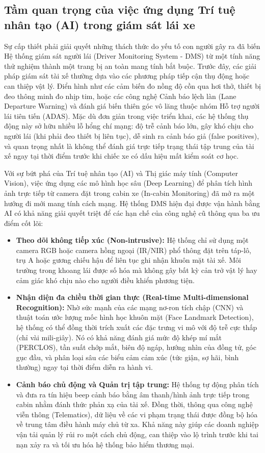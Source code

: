 \documentclass[../DoAn.tex]{subfiles}
\begin{document}
\subsection{Tầm quan trọng của việc ứng dụng Trí tuệ nhân tạo (AI) trong giám sát lái xe}
Sự cấp thiết phải giải quyết những thách thức do yếu tố con người gây ra đã biến Hệ thống giám sát người lái (Driver Monitoring System - DMS) từ một tính năng thử nghiệm thành một trang bị an toàn mang tính bắt buộc. Trước đây, các giải pháp giám sát tài xế thường dựa vào các phương pháp tiếp cận thụ động hoặc can thiệp vật lý. Điển hình như các cảm biến đo nồng độ cồn qua hơi thở, thiết bị đeo thông minh đo nhịp tim, hoặc các công nghệ Cảnh báo lệch làn (Lane Departure Warning) và đánh giá biến thiên góc vô lăng thuộc nhóm Hỗ trợ người lái tiên tiến (ADAS). Mặc dù đơn giản trong việc triển khai, các hệ thống thụ động này sở hữu nhiều lỗ hổng chí mạng: độ trễ cảnh báo lớn, gây khó chịu cho người lái (khi phải đeo thiết bị liên tục), dễ sinh ra cảnh báo giả (false positives), và quan trọng nhất là không thể đánh giá trực tiếp trạng thái tập trung của tài xế ngay tại thời điểm trước khi chiếc xe có dấu hiệu mất kiểm soát cơ học.

Với sự bứt phá của Trí tuệ nhân tạo (AI) và Thị giác máy tính (Computer Vision), việc ứng dụng các mô hình học sâu (Deep Learning) để phân tích hình ảnh trực tiếp từ camera đặt trong cabin xe (In-cabin Monitoring) đã mở ra một hướng đi mới mang tính cách mạng. Hệ thống DMS hiện đại được vận hành bằng AI có khả năng giải quyết triệt để các hạn chế của công nghệ cũ thông qua ba ưu điểm cốt lõi:
\begin{itemize}
    \item \textbf{Theo dõi không tiếp xúc (Non-intrusive):} Hệ thống chỉ sử dụng một camera RGB hoặc camera hồng ngoại (IR/NIR) phổ thông đặt trên táp-lô, trụ A hoặc gương chiếu hậu để liên tục ghi nhận khuôn mặt tài xế. Môi trường trong khoang lái được số hóa mà không gây bất kỳ cản trở vật lý hay cảm giác khó chịu nào cho người điều khiển phương tiện.
    \item \textbf{Nhận diện đa chiều thời gian thực (Real-time Multi-dimensional Recognition):} Nhờ sức mạnh của các mạng nơ-ron tích chập (CNN) và thuật toán ước lượng mốc hình học khuôn mặt (Face Landmark Detection), hệ thống có thể đồng thời trích xuất các đặc trưng vi mô với độ trễ cực thấp (chỉ vài mili-giây). Nó có khả năng đánh giá mức độ khép mí mắt (PERCLOS), tần suất chớp mắt, biên độ ngáp, hướng nhìn của đồng tử, góc gục đầu, và phân loại sâu các biểu cảm cảm xúc (tức giận, sợ hãi, bình thường) ngay tại thời điểm diễn ra hành vi.
    \item \textbf{Cảnh báo chủ động và Quản trị tập trung:} Hệ thống tự động phân tích và đưa ra tín hiệu beep cảnh báo bằng âm thanh/hình ảnh trực tiếp trong cabin nhằm đánh thức phản xạ của tài xế. Đồng thời, thông qua công nghệ viễn thông (Telematics), dữ liệu về các vi phạm trạng thái được đồng bộ hóa về trung tâm điều hành máy chủ từ xa. Khả năng này giúp các doanh nghiệp vận tải quản lý rủi ro một cách chủ động, can thiệp vào lộ trình trước khi tai nạn xảy ra và tối ưu hóa hệ thống bảo hiểm thương mại.
\end{itemize}
\end{document}
